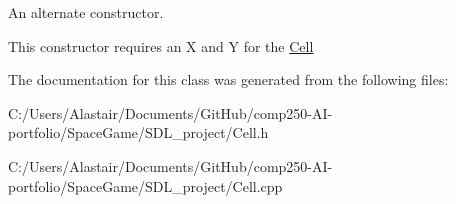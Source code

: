 An alternate constructor. 

This constructor requires an X and Y for the \hyperlink{class_cell}{Cell} 

The documentation for this class was generated from the following files\+:\begin{DoxyCompactItemize}
\item 
C\+:/\+Users/\+Alastair/\+Documents/\+Git\+Hub/comp250-\/\+A\+I-\/portfolio/\+Space\+Game/\+S\+D\+L\+\_\+project/Cell.\+h\item 
C\+:/\+Users/\+Alastair/\+Documents/\+Git\+Hub/comp250-\/\+A\+I-\/portfolio/\+Space\+Game/\+S\+D\+L\+\_\+project/Cell.\+cpp\end{DoxyCompactItemize}
